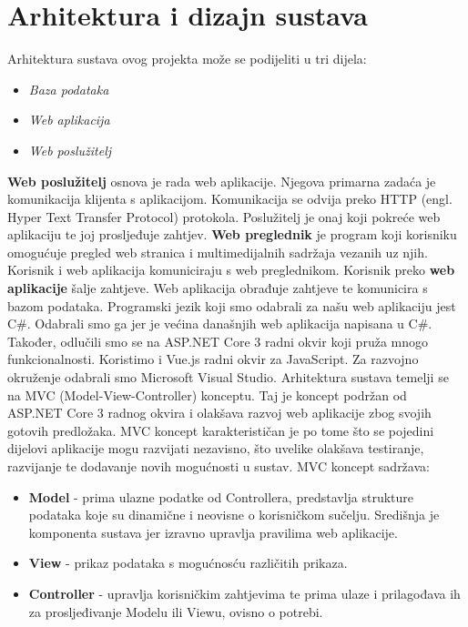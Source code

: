 \chapter{Arhitektura i dizajn sustava}
		

		\textnormal{ Arhitektura sustava ovog projekta može se podijeliti u tri dijela:}
	\begin{itemize}
		\item 	\textit{Baza podataka}
		\item 	\textit{Web aplikacija}
		\item 	\textit{Web poslužitelj}		
	\end{itemize}
\textnormal {\textbf{Web poslužitelj} osnova je rada web aplikacije. Njegova primarna zadaća je komunikacija klijenta s aplikacijom. Komunikacija se odvija preko HTTP (engl. Hyper Text Transfer Protocol) protokola. Poslužitelj je onaj koji pokreće web aplikaciju te joj prosljeđuje zahtjev. \textbf{Web preglednik} je program koji korisniku omogućuje pregled web stranica i multimedijalnih sadržaja vezanih uz njih. Korisnik i web aplikacija komuniciraju s web preglednikom. Korisnik preko \textbf{web aplikacije} šalje zahtjeve. Web aplikacija obrađuje zahtjeve te komunicira s bazom podataka. }
\bigbreak
\textnormal {Programski jezik koji smo odabrali za našu web aplikaciju jest C\#. Odabrali smo ga jer je većina današnjih web aplikacija napisana u C\#. Također, odlučili smo se na ASP.NET Core 3 radni okvir koji pruža mnogo funkcionalnosti. Koristimo i Vue.js radni okvir za JavaScript. Za razvojno okruženje odabrali smo Microsoft Visual Studio.}
\bigbreak
\textnormal{Arhitektura sustava temelji se na MVC (Model-View-Controller) konceptu. Taj je koncept podržan od ASP.NET Core 3 radnog okvira i olakšava razvoj web aplikacije zbog svojih gotovih predložaka. MVC koncept karakterističan je po tome što se pojedini dijelovi aplikacije mogu razvijati nezavisno, što uvelike olakšava testiranje, razvijanje te dodavanje novih mogućnosti u sustav. MVC koncept sadržava:}
\bigbreak
	\begin{itemize}
	\item 	\textbf{Model} - prima ulazne podatke od Controllera, predstavlja strukture podataka koje su dinamične i neovisne o korisničkom sučelju. Središnja je komponenta sustava jer izravno upravlja pravilima web aplikacije.
	\item 	\textbf{View} - prikaz podataka s mogućnosću različitih prikaza.
	\item 	\textbf{Controller}	- upravlja korisničkim zahtjevima te prima ulaze i prilagođava ih za prosljeđivanje Modelu ili Viewu, ovisno o potrebi.
\end{itemize}

